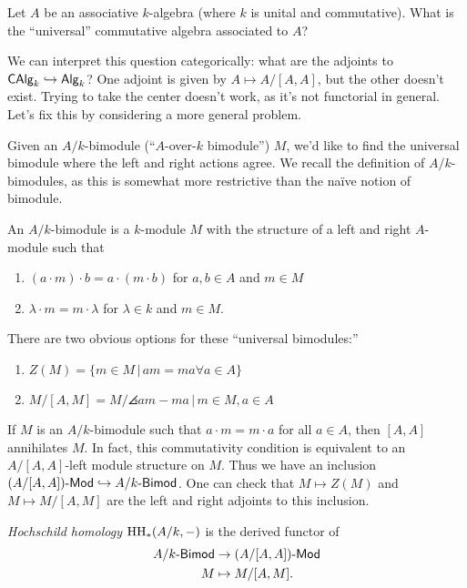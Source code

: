 \documentclass{amsart}
\begin{document}
Let $A$ be an associative $k$-algebra (where $k$ is unital and commutative).
What is the ``universal'' commutative algebra associated to $A$?

We can interpret this question categorically: what are the adjoints to $\mathsf{CAlg}_k \hookrightarrow \mathsf{Alg}_k$?
One adjoint is given by $A \mapsto A / [A, A]$, but the other doesn't exist.
Trying to take the center doesn't work, as it's not functorial in general.
Let's fix this by considering a more general problem.

Given an $A / k$-bimodule (``$A$-over-$k$ bimodule'') $M$, we'd like to find the universal bimodule where the left and right actions agree.
We recall the definition of $A / k$-bimodules, as this is somewhat more restrictive than the na\"ive notion of bimodule.

\begin{dfn}
	An $A / k$-bimodule is a $k$-module $M$ with the structure of a left and right $A$-module such that
	\begin{enumerate}
		\item $(a \cdot m) \cdot b = a \cdot (m \cdot b)$ for $a, b \in A$ and $m \in M$
		\item $\lambda \cdot m = m \cdot \lambda$ for $\lambda \in k$ and $m \in M$.
	\end{enumerate}
\end{dfn}

There are two obvious options for these ``universal bimodules:''
\begin{enumerate}
	\item $Z(M) = \{ m \in M \,|\, am = ma \forall a \in A \}$
	\item $M / [A, M] = M / \angles{am - ma \,|\, m \in M, a \in A}$
\end{enumerate}

If $M$ is an $A / k$-bimodule such that $a \cdot m = m \cdot a$ for all $a \in A$, then $[A, A]$ annihilates $M$.
In fact, this commutativity condition is equivalent to an $A / [A, A]$-left module structure on $M$.
Thus we have an inclusion $(A / [A, A])\textrm{-}\mathsf{Mod} \hookrightarrow A / k\textrm{-}\mathsf{Bimod}$.
One can check that $M \mapsto Z(M)$ and $M \mapsto M / [A, M]$ are the left and right adjoints to this inclusion.

\begin{dfn}
	\emph{Hochschild homology} $\mathrm{HH}_*(A/k, -)$ is the derived functor of 
	\begin{align*}
		A / k\textrm{-}\mathsf{Bimod} &\to (A / [A, A])\textrm{-}\mathsf{Mod} \\
		M &\mapsto M / [A, M].
	\end{align*}
\end{dfn}
\end{document}

